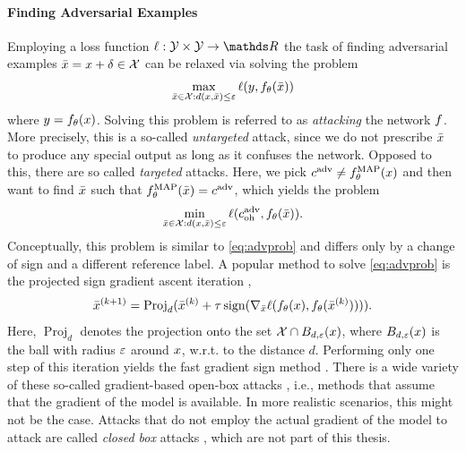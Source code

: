 \paragraph{Finding Adversarial Examples} Employing a loss function $\ell:\Oup\times\Oup\to\R$ the task of finding adversarial examples $\bar{x}=x+\delta\in\mathcal{X}$ can be relaxed via solving the problem
%
\begin{align}\label{eq:advprob}
\max_{\bar{x}\in \mathcal{X}:d(x,\bar{x})\leq \varepsilon} \ell(y, f_\theta(\bar{x}))
\end{align}
%
where $y=f_\theta(x)$. Solving this problem is referred to as \emph{attacking} the network $f$. More precisely, this is a so-called \emph{untargeted} attack, since we do not prescribe $\bar{x}$ to produce any special output as long as it confuses the network. Opposed to this, there are so called \emph{targeted} attacks. Here, we pick $c^{\operatorname{adv}} \neq f^{\operatorname{MAP}}_\theta(x)$ and then want to find $\bar{x}$ such that $f^{\operatorname{MAP}}_\theta(\bar{x}) = c^{\operatorname{adv}}$, which yields the problem
%
\begin{align*}
\min_{\bar{x}\in \mathcal{X}:d(x,\bar{x})\leq \varepsilon} \ell(c^{\operatorname{adv}}_{{\operatorname{oh}}}, f_\theta(\bar{x})).
\end{align*}
%
%
Conceptually, this problem is similar to \cref{eq:advprob} and differs only by a change of sign and a different reference label.
%
A popular method to solve \cref{eq:advprob} is the projected sign gradient ascent iteration \cite{kurakin2016adversarial},
%
\begin{align*}
\bar{x}^{(k+1)} = \operatorname{Proj}_d(\bar{x}^{(k)} + \tau \operatorname*{sign}(\nabla_{\bar{x}}
\ell(f_\theta(x), f_\theta(\bar{x}^{(k)})))).
\end{align*}
%
%
%
Here, $\operatorname{Proj}_d$ denotes the projection onto the set $\mathcal{X}\cap B_{d,\varepsilon}(x)$, where $B_{d,\varepsilon}(x)$ is the ball with radius $\varepsilon$ around $x$, w.r.t. to the distance $d$. Performing only one step of this iteration yields the fast gradient sign method \cite{goodfellow2014explaining}. There is a wide variety of these so-called gradient-based open-box attacks \cite{yuan2019adversarial}, i.e., methods that assume that the gradient of the model is available. In more realistic scenarios, this might not be the case. Attacks that do not employ the actual gradient of the model to attack are called \emph{closed box} attacks \cite{ilyas2018black}, which are not part of this thesis.
%
%
